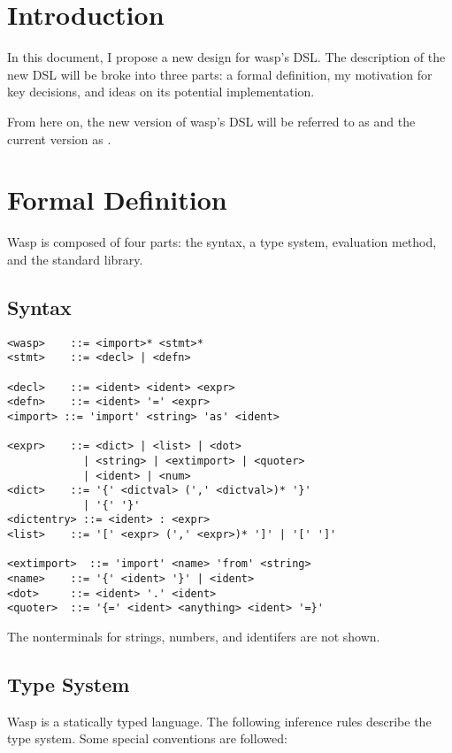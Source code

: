 \section{Introduction}

In this document, I propose a new design for wasp's DSL. The description
of the new DSL will be broke into three parts: a formal definition, my
motivation for key decisions, and ideas on its potential implementation.

From here on, the new version of wasp's DSL will be referred to as 
and the current version as .

\section{Formal Definition}

Wasp is composed of four parts: the syntax, a type system, evaluation method,
and the standard library.

\subsection{Syntax}

\begin{verbatim}
<wasp>    ::= <import>* <stmt>*
<stmt>    ::= <decl> | <defn>

<decl>    ::= <ident> <ident> <expr>
<defn>    ::= <ident> '=' <expr>
<import> ::= 'import' <string> 'as' <ident>

<expr>    ::= <dict> | <list> | <dot>
            | <string> | <extimport> | <quoter>
            | <ident> | <num>
<dict>    ::= '{' <dictval> (',' <dictval>)* '}'
            | '{' '}'
<dictentry> ::= <ident> : <expr>
<list>    ::= '[' <expr> (',' <expr>)* ']' | '[' ']'

<extimport>  ::= 'import' <name> 'from' <string>
<name>    ::= '{' <ident> '}' | <ident>
<dot>     ::= <ident> '.' <ident>
<quoter>  ::= '{=' <ident> <anything> <ident> '=}'
\end{verbatim}

The nonterminals for strings, numbers, and identifers are not shown.

\subsection{Type System}

Wasp is a statically typed language. The following inference rules describe the
type system. Some special conventions are followed:

